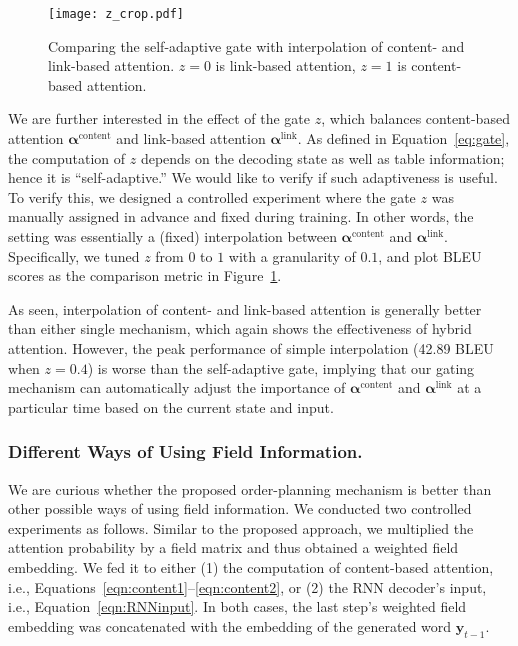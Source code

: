 \documentclass[letterpaper]{article} %
\begin{document}
\begin{figure}[!t]
	\centering
	\texttt{[image: z\_crop.pdf]}
	\vspace{-.3cm}
	\caption{Comparing the self-adaptive gate with interpolation of content- and link-based attention. $z=0$ is link-based attention, $z=1$ is content-based attention.}\label{fig:gate}
\end{figure}
We are further interested in the effect of the gate $z$, which balances content-based attention $\bm\alpha^\text{content}$ and link-based attention $\bm\alpha^\text{link}$. As defined in Equation~\ref{eq:gate}, the computation of $z$ depends on the decoding state as well as table information; hence it is ``self-adaptive.'' We would like to verify if such adaptiveness is useful. To verify this, we designed a controlled experiment where the gate $z$ was manually assigned in advance and fixed during training. In other words, the setting was essentially a (fixed) interpolation between $\bm\alpha^\text{content}$ and $\bm\alpha^\text{link}$. Specifically, we tuned $z$ from $0$ to $1$ with a granularity of $0.1$, and plot  BLEU scores as the comparison metric in Figure~\ref{fig:gate}.

As seen, interpolation of content- and link-based attention is generally better than either  single mechanism, which again shows the effectiveness of hybrid attention. However, the peak performance of simple interpolation (42.89 BLEU when $z=0.4$) is worse than the self-adaptive gate, implying that our gating mechanism can automatically adjust the importance of $\bm\alpha^\text{content}$ and $\bm\alpha^\text{link}$ at a particular time based on the current state and input.

\subsubsection{Different Ways of Using Field Information.}
We are curious whether the proposed order-planning mechanism is better than other possible ways of using field information. We conducted two controlled experiments as follows. Similar to the proposed approach, we multiplied the attention probability by a field matrix and thus obtained a weighted field embedding. We fed it to either (1) the computation of content-based attention, i.e., Equations~\ref{eqn:content1}--\ref{eqn:content2}, or (2) the RNN decoder's input, i.e., Equation~\ref{eqn:RNNinput}. In both cases, the last step's weighted field embedding was concatenated with the embedding of the generated word $\bm y_{t-1}$.
\end{document}
